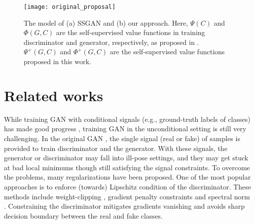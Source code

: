 \documentclass{article}
\begin{document}
\begin{figure}
  \centering
\texttt{[image: original\_proposal]}
\caption{The model of (a) SSGAN \cite{chen-arxiv-2018} and (b) our approach. Here, $\Psi(C)$ and $\Phi(G,C)$ are the self-supervised value functions in training discriminator and generator, respectively, as proposed in \cite{chen-arxiv-2018}. $\Psi^+(G,C)$ and $\Phi^+(G,C)$ are the self-supervised value functions proposed in this work.}
  \label{proposed_model}
  \vspace{-0.4cm}
\end{figure}





 
\section{Related works}

While training GAN with conditional signals (e.g., ground-truth labels of classes) has made good progress \cite{odena-icml-2017,zhang-arxiv-2018,brock-iclr-2018}, training GAN in the unconditional setting is still very challenging. In the original GAN \cite{goodfellow-nisp-2014}, the single signal (real or fake) of samples is provided to train discriminator and the generator. With these signals, the generator or discriminator may fall into ill-pose settings, and they may get stuck at bad local minimums though still satisfying the signal constraints. To overcome the problems, many regularizations have been proposed. One of the most popular approaches is to enforce (towards) Lipschitz condition of the discriminator. These methods include weight-clipping \cite{arjovsky-arxiv-2017a}, gradient penalty constraints \cite{gulrajani-arxiv-2017,roth-nips-2017,kodali-arxiv-2017,petzka-arxiv-2017,liu-arxiv-2018} and spectral norm \cite{miyato-iclr-2018}. Constraining the discriminator mitigates gradients vanishing and avoids sharp decision boundary between the real and fake classes. 
\end{document}
